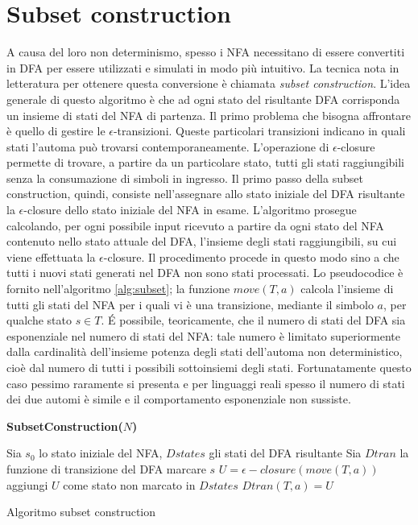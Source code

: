 \section{Subset construction} \label{subset}
A causa del loro non determinismo, spesso i NFA necessitano di essere convertiti in DFA per essere utilizzati e simulati in modo più intuitivo. La tecnica nota in letteratura per ottenere questa conversione è chiamata \emph{subset construction}.
L'idea generale di questo algoritmo è che ad ogni stato del risultante DFA corrisponda un insieme di stati del NFA di partenza.
Il primo problema che bisogna affrontare è quello di gestire le $\epsilon$-transizioni. Queste particolari transizioni indicano in quali stati l'automa può trovarsi contemporaneamente. L'operazione di $\epsilon$-closure permette di trovare, a partire da un particolare stato, tutti gli stati raggiungibili senza la consumazione di simboli in ingresso. Il primo passo della subset construction, quindi, consiste nell'assegnare allo stato iniziale del DFA risultante la $\epsilon$-closure dello stato iniziale del NFA in esame. L'algoritmo prosegue calcolando, per ogni possibile input ricevuto a partire da ogni stato del NFA contenuto nello  stato attuale del DFA, l'insieme degli stati raggiungibili, su cui viene effettuata la $\epsilon$-closure. Il procedimento procede in questo modo sino a che tutti i nuovi stati generati nel DFA non sono stati processati. Lo pseudocodice è fornito nell'algoritmo \ref{alg:subset}; la funzione $move(T,a)$ calcola l'insieme di tutti gli stati del NFA per i quali vi è una transizione, mediante il simbolo $a$, per qualche stato $s \in T$.
\'E possibile, teoricamente, che il numero di stati del DFA sia esponenziale nel numero di stati del NFA: tale numero è limitato superiormente dalla cardinalità dell'insieme potenza degli stati dell'automa non deterministico, cioè dal numero di tutti i possibili sottoinsiemi degli stati.
Fortunatamente questo caso pessimo raramente si presenta e per linguaggi reali spesso il numero di stati dei due automi è simile e il comportamento esponenziale non sussiste.

\begin{algorithm}
\textbf{SubsetConstruction($N$)}
\begin{algorithmic}
\STATE Sia $s_0$ lo stato iniziale del NFA, $Dstates$ gli stati del DFA risultante
\STATE Sia $Dtran$ la funzione di transizione del DFA
	\STATE marcare $s$
		\STATE $U = \epsilon-closure(move(T,a))$
			\STATE aggiungi $U$ come stato non marcato in $Dstates$
		\ENDIF
		\STATE $Dtran(T,a) = U$
	\ENDFOR
\ENDWHILE
\end{algorithmic}
\caption{Algoritmo subset construction}
\label{alg:subset}
\end{algorithm}

